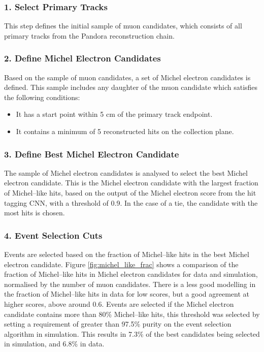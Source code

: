 \subsubsection*{1. Select Primary Tracks}
This step defines the initial sample of muon candidates, which consists of all
primary tracks from the Pandora reconstruction chain.

\subsubsection*{2. Define Michel Electron Candidates}
Based on the sample of muon candidates, a set of Michel electron candidates is
defined. This sample includes any daughter of the muon candidate which satisfies
the following conditions:
\begin{itemize}
	\item It has a start point within 5 cm of the primary track endpoint.
	\item It contains a minimum of 5 reconstructed hits on the collection plane.
\end{itemize}

\subsubsection*{3. Define Best Michel Electron Candidate}
The sample of Michel electron candidates is analysed to select the best Michel
electron candidate. This is the Michel electron candidate with the largest
fraction of Michel--like hits, based on the output of the Michel electron score
from the hit tagging CNN, with a threshold of 0.9. In the case of a tie, the 
candidate with the most hits is chosen.

\subsubsection*{4. Event Selection Cuts}
Events are selected based on the fraction of Michel--like hits in the best 
Michel electron candidate. Figure \ref{fig:michel_like_frac} shows a comparison 
of the fraction of Michel--like hits in Michel electron candidates for 
\protodune{} data and simulation, normalised by the number of muon candidates. 
There is a less good modelling in the fraction of Michel--like hits in 
data for low scores, but a good agreement at higher scores, above around 0.6. 
Events are selected if the Michel electron candidate contains more than 80\% 
Michel--like hits, this threshold was selected by setting a requirement of 
greater than 97.5\% purity on the event selection algorithm in simulation. This 
results in 7.3\% of the best candidates being selected in simulation, and 6.8\% 
in data.

